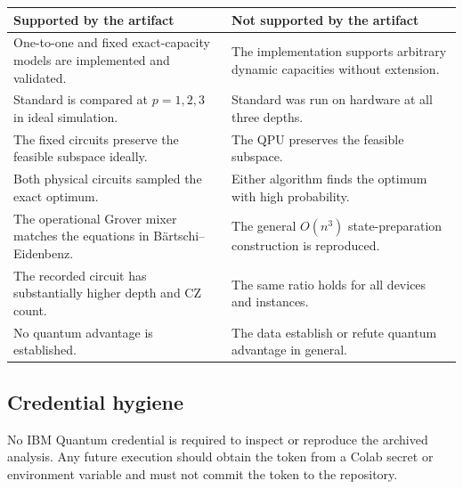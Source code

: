 \begin{table}[H]
\centering
\small
\begin{tabularx}{\textwidth}{>{\raggedright\arraybackslash}X>{\raggedright\arraybackslash}X}
\toprule
Supported by the artifact & Not supported by the artifact\\
\midrule
One-to-one and fixed exact-capacity \QUBO{} models are implemented and validated. & The implementation supports arbitrary dynamic capacities without extension.\\
Standard \QAOA{} is compared at $p=1,2,3$ in ideal simulation. & Standard \QAOA{} was run on hardware at all three depths.\\
The fixed \GMQAOA{} circuits preserve the feasible subspace ideally. & The QPU preserves the \GMQAOA{} feasible subspace.\\
Both physical circuits sampled the exact optimum. & Either algorithm finds the optimum with high probability.\\
The operational Grover mixer matches the equations in Bärtschi--Eidenbenz. & The general $O(n^3)$ state-preparation construction is reproduced.\\
The recorded \GMQAOA{} circuit has substantially higher depth and CZ count. & The same ratio holds for all devices and instances.\\
No quantum advantage is established. & The data establish or refute quantum advantage in general.\\
\bottomrule
\end{tabularx}
\end{table}

\subsection{Credential hygiene}

No IBM Quantum credential is required to inspect or reproduce the archived analysis. Any future execution should obtain the token from a Colab secret or environment variable and must not commit the token to the repository.
